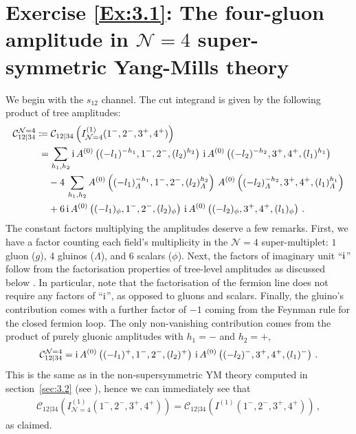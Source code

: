 \section*{Exercise \ref{Ex:3.1}: The four-gluon amplitude in $\mathcal{N}=4$ super-symmetric Yang-Mills theory}
\label{Sol:3.1}
%
We begin with the $s_{12}$ channel. The cut integrand is given by the following product of tree amplitudes:
\begin{align}
\mathcal{C}^{\mathcal{N}=4}_{12|34} & \coloneqq \mathcal{C}_{12|34}\left(I^{(1)}_{\mathcal{N}=4}(1^-,2^-,3^+,4^+) \right) \nonumber \\
& \phantom{:} =  \sum_{h_1,h_2} \i \, A^{(0)}\left( (-l_1)^{-h_1},1^-,2^-,(l_2)^{h_2} \right) \, \i \, A^{(0)}\left( (-l_2)^{-h_2},3^+,4^+,(l_1)^{h_1} \right) \nonumber \\
& \phantom{\coloneqq {}} - 4 \, \sum_{h_1,h_2} A^{(0)}\left( (-l_1)^{-h_1}_{\Lambda},1^-,2^-,(l_2)^{h_2}_{\Lambda} \right) \, A^{(0)}\left( (-l_2)^{-h_2}_{\Lambda},3^+,4^+,(l_1)^{h_1}_{\Lambda} \right) \nonumber \\
& \phantom{\coloneqq {}} + 6 \, \i \, A^{(0)}\left( (-l_1)_{\phi},1^-,2^-,(l_2)_{\phi} \right) \, \i \, A^{(0)}\left( (-l_2)_{\phi},3^+,4^+,(l_1)_{\phi} \right) \,.
\end{align}
The constant factors multiplying the amplitudes deserve a few remarks. First, we have a factor counting each field's multiplicity in the $\mathcal{N}=4$ super-multiplet: $1$ gluon ($g$), $4$ gluinos ($\Lambda$), and $6$ scalars ($\phi$). Next, the factors of imaginary unit ``$\mathrm{i}$'' follow from the factorisation properties of tree-level amplitudes as discussed below . In particular, note that the factorisation of the fermion line does not require any factors of ``$\mathrm{i}$'', as opposed to gluons and scalars. Finally, the gluino's contribution comes with a further factor of $-1$ coming from the Feynman rule for the closed fermion loop. The only non-vanishing contribution comes from the product of purely gluonic amplitudes with $h_1=-$ and $h_2=+$,
\begin{align}
\mathcal{C}_{12|34}^{\mathcal{N}=4} = 
  \mathrm{i} \, A^{(0)}\left( (-l_1)^{+},1^-,2^-,(l_2)^{+} \right) \, \mathrm{i} \,
  A^{(0)}\left( (-l_2)^{-},3^+,4^+ ,(l_1)^{-} \right) \,.
\end{align}
This is the same as in the non-supersymmetric YM theory computed in section~\ref{sec:3.2} (see ), hence we can immediately see that 
\begin{align}
\mathcal{C}_{12|34}\left( I^{(1)}_{\mathcal{N}=4}(1^-,2^-,3^+,4^+) \right)=\mathcal{C}_{12|34}\left( I^{(1)}(1^-,2^-,3^+,4^+) \right) \,, 
\end{align}
as claimed.

